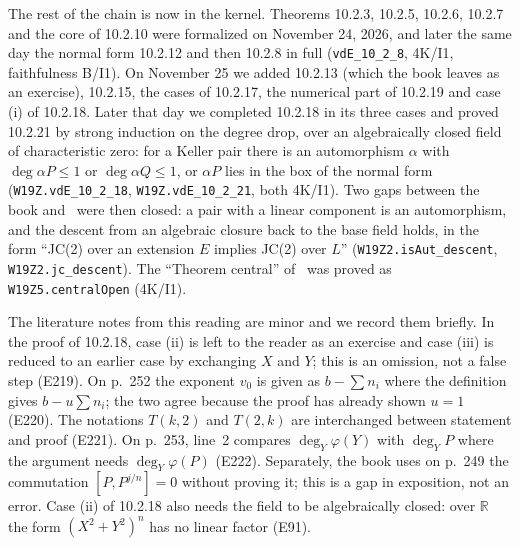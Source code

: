 \documentclass[a4paper,11pt]{article}
\theoremstyle{jsplain}
\theoremstyle{jsdef}
\theoremstyle{jsrem}
\begin{document}
The rest of the chain is now in the kernel. Theorems 10.2.3, 10.2.5, 10.2.6, 10.2.7 and the core of 10.2.10 were formalized on November 24, 2026, and later the same day the normal form 10.2.12 and then 10.2.8 in full (\texttt{vdE\_\allowbreak{}10\_\allowbreak{}2\_\allowbreak{}8}, 4K/I1, faithfulness B/I1). On November 25 we added 10.2.13 (which the book leaves as an exercise), 10.2.15, the cases of 10.2.17, the numerical part of 10.2.19 and case (i) of 10.2.18. Later that day we completed 10.2.18 in its three cases and proved 10.2.21 by strong induction on the degree drop, over an algebraically closed field of characteristic zero: for a Keller pair there is an automorphism $\alpha$ with $\deg\alpha P\le1$ or $\deg\alpha Q\le1$, or $\alpha P$ lies in the box of the normal form (\texttt{W19Z.\allowbreak{}vdE\_\allowbreak{}10\_\allowbreak{}2\_\allowbreak{}18}, \texttt{W19Z.\allowbreak{}vdE\_\allowbreak{}10\_\allowbreak{}2\_\allowbreak{}21}, both 4K/I1). Two gaps between the book and~\cite{GGV1} were then closed: a pair with a linear component is an automorphism, and the descent from an algebraic closure back to the base field holds, in the form ``JC(2) over an extension $E$ implies JC(2) over $L$'' (\texttt{W19Z2.\allowbreak{}isAut\_\allowbreak{}descent}, \texttt{W19Z2.\allowbreak{}jc\_\allowbreak{}descent}). The ``Theorem central'' of~\cite{GGV1} was proved as \texttt{W19Z5.\allowbreak{}centralOpen} (4K/I1).

The literature notes from this reading are minor and we record them briefly. In the proof of 10.2.18, case (ii) is left to the reader as an exercise and case (iii) is reduced to an earlier case by exchanging $X$ and $Y$; this is an omission, not a false step (E219). On p.~252 the exponent $v_0$ is given as $b-\sum n_i$ where the definition gives $b-u\sum n_i$; the two agree because the proof has already shown $u=1$ (E220). The notations $T(k,2)$ and $T(2,k)$ are interchanged between statement and proof (E221). On p.~253, line~2 compares $\deg_Y\varphi(Y)$ with $\deg_YP$ where the argument needs $\deg_Y\varphi(P)$ (E222). Separately, the book uses on p.~249 the commutation $[P,P^{j/n}]=0$ without proving it; this is a gap in exposition, not an error. Case (ii) of 10.2.18 also needs the field to be algebraically closed: over $\mathbb R$ the form $(X^2+Y^2)^n$ has no linear factor (E91).
\end{document}
